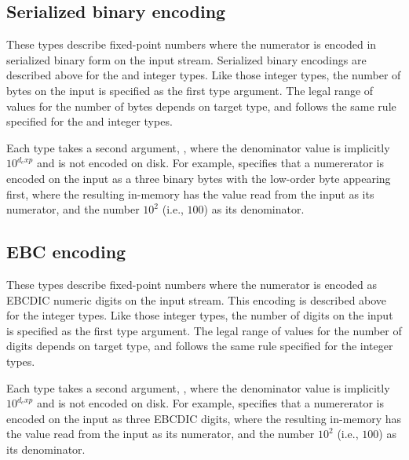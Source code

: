 \subsection{Serialized binary encoding}

\sbBegin{}
\bEnd{}

These types describe fixed-point numbers where the numerator is
encoded in serialized binary form on the input stream.  Serialized
binary encodings are described above for the  and 
integer types.  Like those integer types, the number of bytes on the
input is specified as the first type argument.  The legal range
of values for the number of bytes depends on target type, and follows
the same rule specified for the  and  integer types.

Each type takes a second argument,
, where the denominator value
is implicitly $10^{d_exp}$ and is not encoded on disk.  For example,
 specifies that a numererator is encoded on the
input as a three binary bytes with the low-order byte appearing first,
where the resulting in-memory
 has the value read from the input as its numerator, and
the number $10^2$ (i.e., $100$) as its denominator.

\subsection{EBC encoding}

\ebcBegin{}
\ebcEnd{}

These types describe fixed-point numbers where the numerator is
encoded as EBCDIC numeric digits on the input stream.  This encoding
is described above for the  integer types.  Like those
integer types, the number of digits on the input is specified as the first
type argument.  The legal range of values for the number of
digits depends on target type, and follows the same rule specified for
the  integer types.

Each type takes a second argument,
, where the denominator value
is implicitly $10^{d_exp}$ and is not encoded on disk.  For example,
 specifies that a numererator is encoded on the
input as three EBCDIC digits, where the resulting in-memory
 has the value read from the input as its numerator, and
the number $10^2$ (i.e., $100$) as its denominator.


